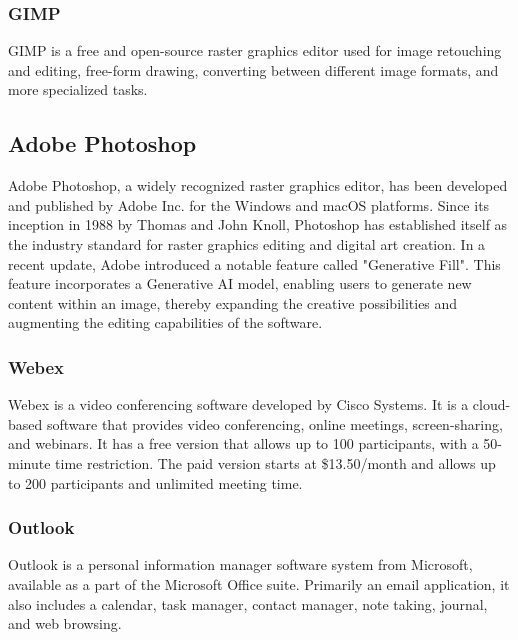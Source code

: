 \subsubsection{GIMP}\label{subsubsec:gimp}
GIMP is a free and open-source raster graphics editor used for image retouching
and editing, free-form drawing, converting between different image formats, and
more specialized tasks.
\subsection{Adobe Photoshop}\label{subsec:adobe-photoshop}
Adobe Photoshop, a widely recognized raster graphics editor, has been developed and published by Adobe Inc. for the Windows and macOS platforms. 
Since its inception in 1988 by Thomas and John Knoll, Photoshop has established itself as the industry standard for raster graphics editing and digital art creation. 
In a recent update, Adobe introduced a notable feature called "Generative Fill". 
This feature incorporates a Generative AI model, enabling users to generate new content within an image, thereby expanding the creative possibilities and augmenting the editing capabilities of the software.
\subsubsection{Webex}\label{subsubsec:webex}
Webex is a video conferencing software developed by Cisco Systems. It is a
cloud-based software that provides video conferencing, online meetings,
screen-sharing, and webinars. It has a free version that allows up to 100
participants, with a 50-minute time restriction. The paid version starts at
\$13.50/month and allows up to 200 participants and unlimited meeting time.
\subsubsection{Outlook}\label{subsubsec:outlook}
Outlook is a personal information manager software system from Microsoft,
available as a part of the Microsoft Office suite. Primarily an email
application, it also includes a calendar, task manager, contact manager,
note taking, journal, and web browsing.

